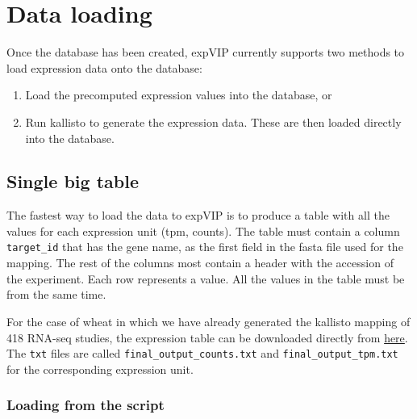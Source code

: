 \section{Data loading}\label{data-loading}

Once the database has been created, expVIP currently supports two
methods to load expression data onto the database:

\begin{enumerate}
\def\labelenumi{\arabic{enumi}.}
\itemsep1pt\parskip0pt
\item
  Load the precomputed expression values into the database, or
\item
  Run kallisto to generate the expression data. These are then loaded
  directly into the database.
\end{enumerate}

\subsection{Single big table}\label{single-big-table}

The fastest way to load the data to expVIP is to produce a table with
all the values for each expression unit (tpm, counts). The table must
contain a column \lstinline!target_id! that has the gene name, as the
first field in the fasta file used for the mapping. The rest of the
columns most contain a header with the accession of the experiment. Each
row represents a value. All the values in the table must be from the
same time.

For the case of wheat in which we have already generated the kallisto
mapping of 418 RNA-seq studies, the expression table can be downloaded
directly from
\href{https://www.dropbox.com/sh/n15tpsqj92wfn8u/AABivEEUj4sRd9tG830WnSi4a?dl=0}{here}.
The \lstinline!txt! files are called \lstinline!final_output_counts.txt!
and \lstinline!final_output_tpm.txt! for the corresponding expression
unit.

\subsubsection{Loading from the script}\label{loading-from-the-script}

